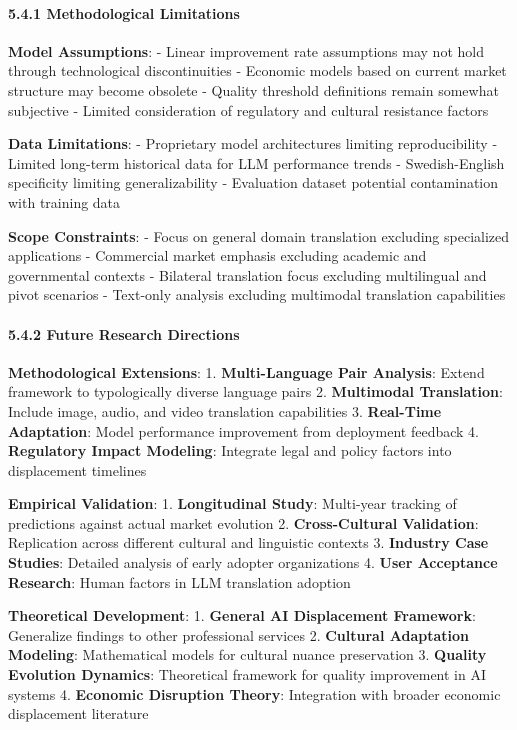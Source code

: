 \documentclass[12pt,a4paper]{article}
\begin{document}
{{{{\hypertarget{methodological-limitations}{%
\paragraph{5.4.1 Methodological
Limitations}\label{methodological-limitations}}

\textbf{Model Assumptions}: - Linear improvement rate assumptions may
not hold through technological discontinuities - Economic models based
on current market structure may become obsolete - Quality threshold
definitions remain somewhat subjective - Limited consideration of
regulatory and cultural resistance factors

\textbf{Data Limitations}: - Proprietary model architectures limiting
reproducibility - Limited long-term historical data for LLM performance
trends - Swedish-English specificity limiting generalizability -
Evaluation dataset potential contamination with training data

\textbf{Scope Constraints}: - Focus on general domain translation
excluding specialized applications - Commercial market emphasis
excluding academic and governmental contexts - Bilateral translation
focus excluding multilingual and pivot scenarios - Text-only analysis
excluding multimodal translation capabilities

\hypertarget{future-research-directions}{%
\paragraph{5.4.2 Future Research
Directions}\label{future-research-directions}}

\textbf{Methodological Extensions}: 1. \textbf{Multi-Language Pair
Analysis}: Extend framework to typologically diverse language pairs 2.
\textbf{Multimodal Translation}: Include image, audio, and video
translation capabilities 3. \textbf{Real-Time Adaptation}: Model
performance improvement from deployment feedback 4. \textbf{Regulatory
Impact Modeling}: Integrate legal and policy factors into displacement
timelines

\textbf{Empirical Validation}: 1. \textbf{Longitudinal Study}:
Multi-year tracking of predictions against actual market evolution 2.
\textbf{Cross-Cultural Validation}: Replication across different
cultural and linguistic contexts 3. \textbf{Industry Case Studies}:
Detailed analysis of early adopter organizations 4. \textbf{User
Acceptance Research}: Human factors in LLM translation adoption

\textbf{Theoretical Development}: 1. \textbf{General AI Displacement
Framework}: Generalize findings to other professional services 2.
\textbf{Cultural Adaptation Modeling}: Mathematical models for cultural
nuance preservation 3. \textbf{Quality Evolution Dynamics}: Theoretical
framework for quality improvement in AI systems 4. \textbf{Economic
Disruption Theory}: Integration with broader economic displacement
literature

}}}}
\end{document}
